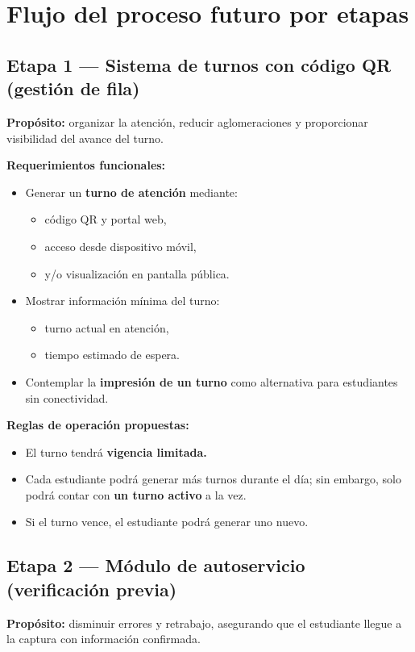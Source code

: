 \documentclass[12pt,a4paper]{article}
\begin{document}
\section{Flujo del proceso futuro por etapas}

\subsection{Etapa 1 --- Sistema de turnos con código QR (gestión de fila)}
\textbf{Propósito:} organizar la atención, reducir aglomeraciones y proporcionar visibilidad del avance del turno.

\textbf{Requerimientos funcionales:}
\begin{itemize}
  \item Generar un \textbf{turno de atención} mediante:
  \begin{itemize}
    \item código QR y portal web,
    \item acceso desde dispositivo móvil,
    \item y/o visualización en pantalla pública.
  \end{itemize}
  \item Mostrar información mínima del turno:
  \begin{itemize}
    \item turno actual en atención,
    \item tiempo estimado de espera.
  \end{itemize}
  \item Contemplar la \textbf{impresión de un turno} como alternativa para estudiantes sin conectividad.
\end{itemize}

\textbf{Reglas de operación propuestas:}
\begin{itemize}
  \item El turno tendrá \textbf{vigencia limitada.}
  \item Cada estudiante podrá generar más turnos durante el día; sin embargo, solo podrá contar con \textbf{un turno activo} a la vez.
  \item Si el turno vence, el estudiante podrá generar uno nuevo.
\end{itemize}

\subsection{Etapa 2 --- Módulo de autoservicio (verificación previa)}
\textbf{Propósito:} disminuir errores y retrabajo, asegurando que el estudiante llegue a la captura con información confirmada.
\end{document}
